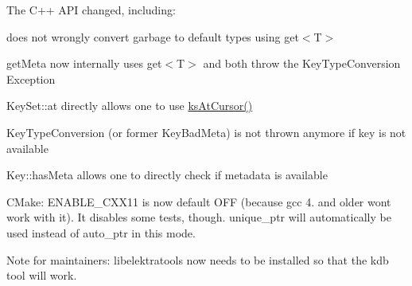 The C++ A\+PI changed, including\+:


\begin{DoxyItemize}
\item does not wrongly convert garbage to default types using {\ttfamily get$<$T$>$}
\item get\+Meta now internally uses {\ttfamily get$<$T$>$} and both throw the Key\+Type\+Conversion Exception
\item Key\+Set\+::at directly allows one to use \hyperlink{group__keyset_ga12b8fefaa20546e4790d60338b0db836}{ks\+At\+Cursor()}
\item Key\+Type\+Conversion (or former Key\+Bad\+Meta) is not thrown anymore if key is not available
\item Key\+::has\+Meta allows one to directly check if metadata is available
\end{DoxyItemize}

C\+Make\+: E\+N\+A\+B\+L\+E\+\_\+\+C\+X\+X11 is now default O\+FF (because gcc 4. and older won\textquotesingle{}t work with it). It disables some tests, though. {\ttfamily unique\+\_\+ptr} will automatically be used instead of {\ttfamily auto\+\_\+ptr} in this mode.

Note for maintainers\+: libelektratools now needs to be installed so that the kdb tool will work.

